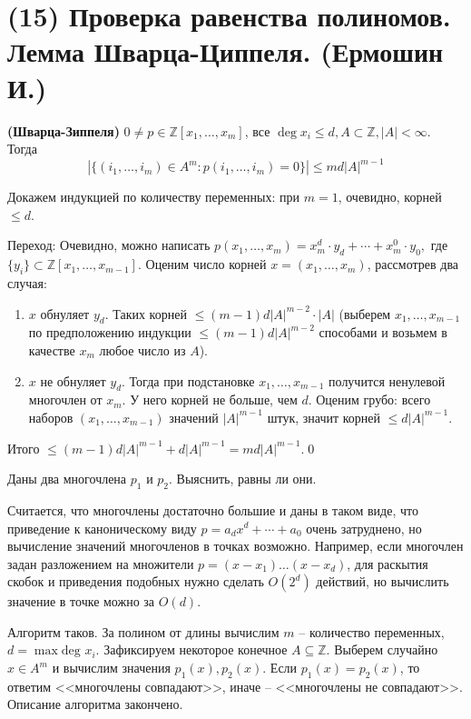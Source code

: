\section{(15) Проверка равенства полиномов. Лемма Шварца-Циппеля. (Ермошин И.)}

\begin{lemma*}{\bf(Шварца-Зиппеля)}
	$0\ne p\in\mathbb{Z}[x_1,\ldots,x_m]$, все $\deg x_i\le d, A\subset\mathbb{Z}, |A|<\infty$. Тогда $$\left|\{(i_1,\ldots,i_m)\in A^m\colon p(i_1,\ldots,i_m)=0\}\right|\le md|A|^{m-1}$$
\end{lemma*}
Докажем индукцией по количеству переменных: при $m=1$, очевидно, корней $\le d$.

Переход:
Очевидно, можно написать $p(x_1,\ldots,x_m)=x_m^d\cdot y_d+\cdots+x_m^0\cdot y_0,$ где $\{y_i\}\subset \mathbb Z[x_1,\ldots,x_{m-1}]$. Оценим число корней $x = (x_1, \ldots, x_m)$, рассмотрев два случая:
\begin{enumerate}
\item $x$ обнуляет $y_d$. Таких корней $\le (m-1)d|A|^{m-2} \cdot |A|$ (выберем $x_1,\ldots,x_{m-1}$ по предположению индукции $\le(m-1)d|A|^{m-2}$ способами и возьмем в качестве $x_m$ любое число из $A$).
\item $x$ не обнуляет $y_d$. Тогда при подстановке $x_1, \ldots, x_{m-1}$ получится ненулевой многочлен от $x_m$. У него корней не больше, чем $d$. Оценим грубо: всего наборов $(x_1, \ldots, x_{m-1})$ значений $|A|^{m-1}$ штук, значит корней $\le d|A|^{m-1}$.
\end{enumerate}

Итого $\le (m-1)d|A|^{m-1}+d|A|^{m-1}=md|A|^{m-1}.$\qed

\begin{problem*}
	Даны два многочлена $p_1$ и $p_2$. Выяснить, равны ли они.
\end{problem*}

Считается, что многочлены достаточно большие и даны в таком виде, что приведение к каноническому виду $p = a_d x^d + \cdots + a_0$ очень затруднено, но вычисление значений многочленов в точках возможно. Например, если многочлен задан разложением на множители $p = (x-x_1)\ldots(x-x_d)$, для раскытия скобок и приведения подобных нужно сделать $O(2^d)$ действий, но вычислить значение в точке можно за $O(d)$.

Алгоритм таков. За полином от длины вычислим $m$ -- количество переменных, $d = \max\text{deg } x_i$. Зафиксируем некоторое конечное $A \subseteq \mathbb Z$. Выберем случайно $x \in A^m$ и вычислим значения $p_1(x), p_2(x)$. Если $p_1(x) = p_2(x)$, то ответим <<многочлены совпадают>>, иначе -- <<многочлены не совпадают>>. Описание алгоритма закончено.

